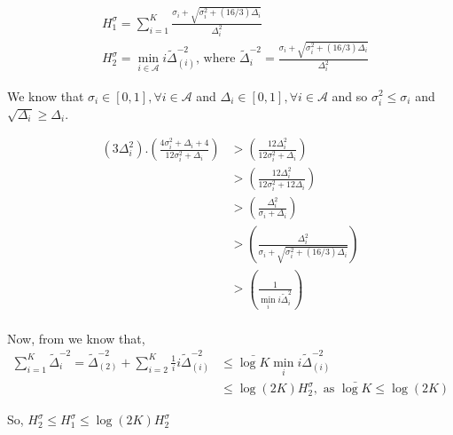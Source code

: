 \appendix
\begin{align*}
& H_{1}^{\sigma}=\sum_{i=1}^{K}\frac{\sigma_{i}+\sqrt{\sigma_{i}^{2}+(16/3)\Delta_{i}}}{\Delta_{i}^{2}}\\
& H_{2}^{\sigma}=\min_{i\in \mathcal{A}} i\tilde{\Delta}_{(i)}^{-2} \text{, where } \tilde{\Delta}_{i}^{-2}=\frac{\sigma_{i}+\sqrt{\sigma_{i}^{2}+(16/3)\Delta_{i}}}{\Delta_{i}^{2}}
\end{align*}

We know that $\sigma_{i}\in [0,1], \forall i\in \mathcal{A}$ and $\Delta_{i}\in [0,1], \forall i\in \mathcal{A}$ and so $\sigma_{i}^{2} \leq \sigma_{i}$ and $\sqrt{\Delta_{i}} \geq \Delta_{i}$.

\begin{align*}
(3\Delta_{i}^{2}).\left(\frac{4\sigma_{i}^{2}+\Delta_{i}+4}{12\sigma_{i}^{2}+\Delta_{i}}\right) & >  \left(\frac{12\Delta_{i}^{2}}{12\sigma_{i}^{2}+\Delta_{i}}\right)\\
& > \left(\frac{12\Delta_{i}^{2}}{12\sigma_{i}^{2}+12\Delta_{i}}\right)\\
& > \left(\frac{\Delta_{i}^{2}}{\sigma_{i}+\Delta_{i}}\right)\\
& > \left(\frac{\Delta_{i}^{2}}{\sigma_{i}+\sqrt{\sigma_{i}^{2} + (16/3)\Delta_{i}}}\right)\\
& > \left(\frac{1}{\min_{i}i\tilde{\Delta}_{i}^{2}}\right)\\
\end{align*}

Now, from \cite{audibert2010best} we know that,
\begin{align*}
\sum_{i=1}^{K}\tilde{\Delta}_{i}^{-2} = \tilde{\Delta}_{(2)}^{-2} + \sum_{i=2}^{K}\frac{1}{i}i\tilde{\Delta}_{(i)}^{-2} &\leq \bar{\log K}\min_{i}i\tilde{\Delta}_{(i)}^{-2}\\
& \leq \log(2K) H_{2}^{\sigma}, \text{ as $\bar{\log K} \leq \log(2K)$}
\end{align*}

So, $H_{2}^{\sigma} \leq H_{1}^{\sigma} \leq \log(2K) H_{2}^{\sigma}$

